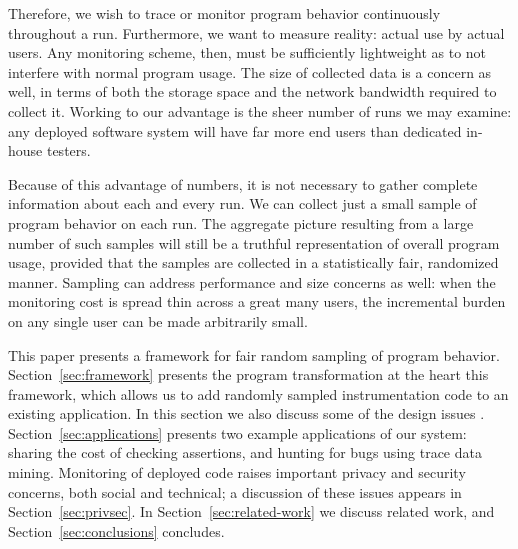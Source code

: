 Therefore, we wish to trace or monitor program behavior continuously
throughout a run.  Furthermore, we want to measure reality: actual use
by actual users.  Any monitoring scheme, then, must be sufficiently
lightweight as to not interfere with normal program usage.  The size
of collected data is a concern as well, in terms of both the storage
space and the network bandwidth required to collect it.  Working to
our advantage is the sheer number of runs we may examine: any deployed
software system will have far more end users than dedicated in-house
testers.

Because of this advantage of numbers, it is not necessary to gather
complete information about each and every run.  We can collect just a
small sample of program behavior on each run.  The aggregate picture
resulting from a large number of such samples will still be a truthful
representation of overall program usage, provided that the samples are
collected in a statistically fair, randomized manner.  Sampling can
address performance and size concerns as well: when the monitoring
cost is spread thin across a great many users, the incremental burden
on any single user can be made arbitrarily small.

This paper presents a framework for fair random sampling of program
behavior.  Section~\ref{sec:framework} presents the program
transformation at the heart this framework, which allows us to add
randomly sampled instrumentation code to an existing application.  In
this section we also discuss some of the design issues
.  Section~\ref{sec:applications} presents two example
applications of our system: sharing the cost of checking assertions,
and hunting for bugs using trace data mining.  Monitoring of deployed
code raises important privacy and security concerns, both social and
technical; a discussion of these issues appears in
Section~\ref{sec:privsec}.  In Section~\ref{sec:related-work} we
discuss related work, and Section~\ref{sec:conclusions} concludes.


